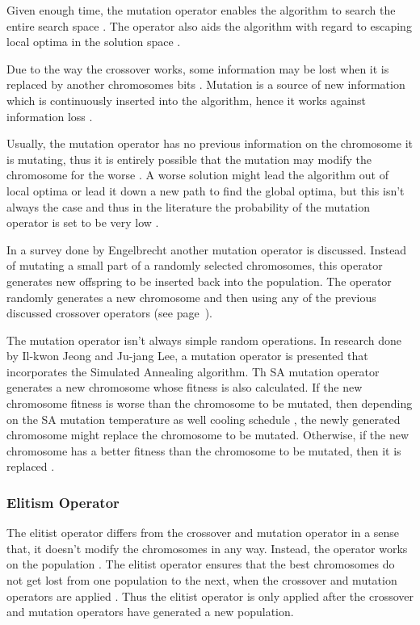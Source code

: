 Given enough time, the mutation operator enables the algorithm to search the entire search space \cite{FamilyGA}. The operator also aids the algorithm with regard to escaping local optima in the solution space \cite{FamilyGA}.

Due to the way the crossover works, some information may be lost when it is replaced by another chromosomes bits \cite{AcceleratingGA,ConstrainedGA}. Mutation is a source of new information which is continuously inserted into the algorithm, hence it works against information loss \cite{CoactiveFuzzyGA,AcceleratingGA,ConstrainedGA}. 

Usually, the mutation operator has no previous information on the chromosome it is mutating, thus it is entirely possible that the mutation may modify the chromosome for the worse \cite{AcceleratingGA}. A worse solution might lead the algorithm out of local optima or lead it down a new path to find the global optima, but this isn't always the case and thus in the literature the probability of the mutation operator is set to be very low \cite{AdaptiveSAGA,FamilyGA,ConstrainedGA}.

In a survey done by Engelbrecht\cite{CompuIntelligenceIntro} another mutation operator is discussed. Instead of mutating a small part of a randomly selected chromosomes, this operator generates new offspring to be inserted back into the population. The operator randomly generates a new chromosome and then using any of the previous discussed crossover operators (see page~\pageref{sec:crossover}).

The mutation operator isn't always simple random operations. In research done by Il-kwon Jeong and Ju-jang Lee, a mutation operator is presented that incorporates the Simulated Annealing algorithm. Th SA mutation operator generates a new chromosome whose fitness is also calculated. If the new chromosome fitness is worse than the chromosome to be mutated, then depending on the SA mutation temperature as well cooling schedule , the newly generated chromosome might replace the chromosome to be mutated. Otherwise, if the new chromosome has a better fitness than the chromosome to be mutated, then it is replaced \cite{AdaptiveSAGA}.

\subsubsection{Elitism Operator}
The elitist operator differs from the crossover and mutation operator in a sense that, it doesn't modify the chromosomes in any way. Instead, the operator works on the population \cite{PatternDetectionGA}. The elitist operator ensures that the best chromosomes do not get lost from one population to the next, when the crossover and mutation operators are applied \cite{HetergeneousGA}. Thus the elitist operator is only applied after the crossover and mutation operators have generated a new population. 


